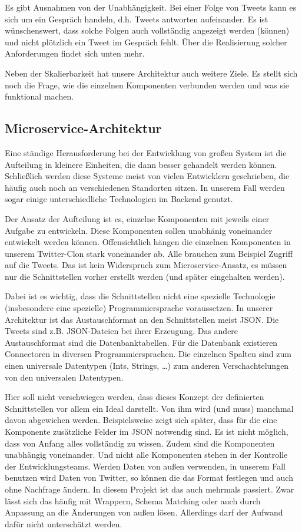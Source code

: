 \begin{itemize}
Es gibt Ausnahmen von der Unabhängigkeit. Bei einer Folge von Tweets kann es sich um ein Gespräch handeln, d.h. Tweets
antworten aufeinander. Es ist wünschenswert, dass solche Folgen auch vollständig angezeigt werden (können) und nicht
plötzlich ein Tweet im Gespräch fehlt. Über die Realisierung solcher Anforderungen findet sich unten mehr.

Neben der Skalierbarkeit hat unsere Architektur auch weitere Ziele. Es stellt sich noch die Frage, wie die einzelnen
Komponenten verbunden werden und was sie funktional machen.

\subsection{Microservice-Architektur}
Eine ständige Herausforderung bei der Entwicklung von großen System ist die Aufteilung in kleinere Einheiten, die
dann besser gehandelt werden können. Schließlich werden diese Systeme meist von vielen Entwicklern geschrieben,
die häufig auch noch an verschiedenen Standorten sitzen. In unserem Fall werden sogar einige unterschiedliche Technologien
im Backend genutzt.

Der Ansatz der Aufteilung ist es, einzelne Komponenten mit jeweils einer Aufgabe zu entwickeln. Diese Komponenten sollen
unabhänig voneinander entwickelt werden können. Offensichtlich hängen die einzelnen Komponenten in unserem
Twitter-Clon stark voneinander ab. Alle brauchen zum Beispiel Zugriff auf die Tweets. Das ist kein Widerspruch zum 
Microservice-Ansatz, es müssen nur die Schnittstellen vorher erstellt werden (und später eingehalten werden).

Dabei ist es wichtig, dass die Schnittstellen nicht eine spezielle Technologie (insbesondere eine spezielle) Programmiersprache
voraussetzen. In unserer Architektur ist das Austauschformat an den Schnittstellen meist JSON. Die Tweets sind z.B.
JSON-Dateien bei ihrer Erzeugung. Das andere Austauschformat sind die Datenbanktabellen. Für die Datenbank existieren
Connectoren in diversen Programmiersprachen. Die einzelnen Spalten sind zum einen universale Datentypen (Ints, Strings, \dots)
zum anderen Verschachtelungen von den universalen Datentypen.

Hier soll nicht verschwiegen werden, dass dieses Konzept der definierten Schnittstellen vor allem ein Ideal darstellt.
Von ihm wird (und muss) manchmal davon abgewichen werden. Beispielsweise zeigt sich später, dass für die eine
Komponente zusätzliche Felder im JSON notwendig sind. Es ist nicht möglich, dass von Anfang alles
vollständig zu wissen. Zudem sind die Komponenten unabhängig voneinander.
Und nicht alle Komponenten stehen in der Kontrolle der Entwicklungsteams. Werden Daten von außen verwenden,
in unserem Fall benutzen wird Daten von Twitter, so können die das Format festlegen und auch ohne Nachfrage ändern.
In diesem Projekt ist das auch mehrmals passiert. Zwar lässt sich das häufig mit Wrappern, Schema Matching oder auch durch Anpassung
an die Änderungen von außen lösen. Allerdings darf der Aufwand dafür nicht unterschätzt werden.


\end{itemize}
